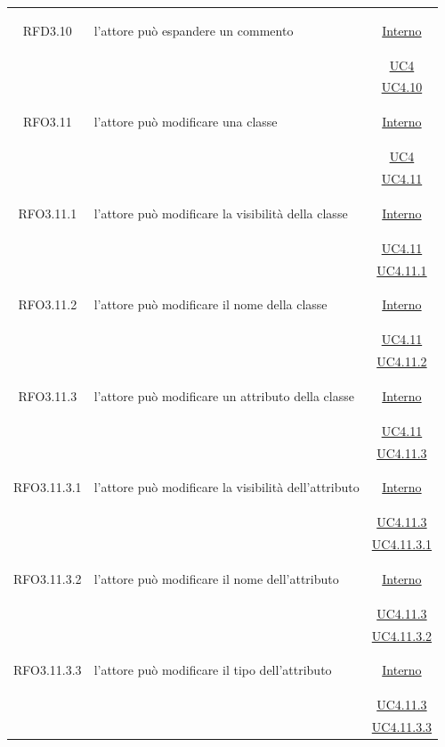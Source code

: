 \begin{longtable}{|c|>{\centering}m{7cm}|c|}
\hypertarget{RFD3.10}{RFD3.10} & l'attore può espandere un commento &  \hyperlink{Interno}{Interno}\\
& &\hyperref[UC4]{UC4}\\
& &\hyperref[UC4.10]{UC4.10}\\ \hline

\hypertarget{RFO3.11}{RFO3.11} & l'attore può modificare una classe &  \hyperlink{Interno}{Interno}\\
& &\hyperref[UC4]{UC4}\\
& &\hyperref[UC4.11]{UC4.11}\\ \hline

\hypertarget{RFO3.11.1}{RFO3.11.1} & l'attore può modificare la visibilità della classe &  \hyperlink{Interno}{Interno}\\
& &\hyperref[UC4.11]{UC4.11}\\
& &\hyperref[UC4.11.1]{UC4.11.1}\\ \hline

\hypertarget{RFO3.11.2}{RFO3.11.2} & l'attore può modificare il nome della classe &  \hyperlink{Interno}{Interno}\\
& &\hyperref[UC4.11]{UC4.11}\\
& &\hyperref[UC4.11.2]{UC4.11.2}\\ \hline

\hypertarget{RFO3.11.3}{RFO3.11.3} & l'attore può modificare un attributo della classe &  \hyperlink{Interno}{Interno}\\
& &\hyperref[UC4.11]{UC4.11}\\
& &\hyperref[UC4.11.3]{UC4.11.3}\\ \hline

\hypertarget{RFO3.11.3.1}{RFO3.11.3.1} & l'attore può modificare la visibilità dell'attributo &  \hyperlink{Interno}{Interno}\\
& &\hyperref[UC4.11.3]{UC4.11.3}\\
& &\hyperref[UC4.11.3.1]{UC4.11.3.1}\\ \hline

\hypertarget{RFO3.11.3.2}{RFO3.11.3.2} & l'attore può modificare il nome dell'attributo &  \hyperlink{Interno}{Interno}\\
& &\hyperref[UC4.11.3]{UC4.11.3}\\
& &\hyperref[UC4.11.3.2]{UC4.11.3.2}\\ \hline

\hypertarget{RFO3.11.3.3}{RFO3.11.3.3} & l'attore può modificare il tipo dell'attributo &  \hyperlink{Interno}{Interno}\\
& &\hyperref[UC4.11.3]{UC4.11.3}\\
& &\hyperref[UC4.11.3.3]{UC4.11.3.3}\\ \hline


\end{longtable}
